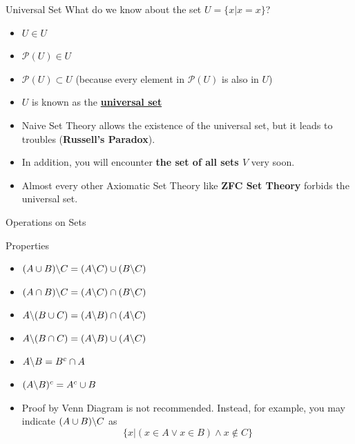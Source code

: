 \begin{frame}{Universal Set}
    What do we know about the set $U=\{x|x=x\}$?
    \mypause
    \begin{itemize}
        \item $U\in U$
        \item $\mathscr{P}(U)\in U$
        \item $\mathscr{P}(U)\subset U$ (because every element in $\mathscr{P}(U)$ is also in $U$)
        \item $U$ is known as the \href{https://en.wikipedia.org/wiki/Universal_set}{\textbf{universal set}}
        \item Naive Set Theory allows the existence of the universal set, but it leads to troubles (\textbf{Russell's Paradox}).
        \item In addition, you will encounter \textbf{the set of all sets $V$} very soon.
        \item Almost every other Axiomatic Set Theory like \textbf{ZFC Set Theory} forbids the universal set.
    \end{itemize}
\end{frame}

\begin{frame}{Operations on Sets}
    \begin{block}{Properties}
    \begin{itemize}
        \item $(A\cup B)\backslash C=(A\backslash C)\cup(B\backslash C)$
        \item $(A\cap B)\backslash C=(A\backslash C)\cap(B\backslash C)$
        \item $A\backslash (B\cup C)=(A\backslash B)\cap(A\backslash C)$
        \item $A\backslash (B\cap C)=(A\backslash B)\cup(A\backslash C)$
        \item $A\backslash B=B^c\cap A$
        \item $(A\backslash B)^c=A^c\cup B$
    \end{itemize}
    \end{block}
    \begin{itemize}
        \item Proof by Venn Diagram is not recommended. Instead, for example, you may indicate $(A\cup B)\backslash C$ as $$\{x|(x\in A \vee x\in B)\wedge x\notin C\}$$
    \end{itemize}
\end{frame}

